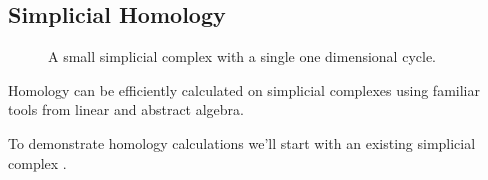 
\subsection{Simplicial Homology}\label{subsec:simpl-hom}

\begin{figure}
    
    \caption{A small simplicial complex with a single one dimensional cycle.}
    \label{fig:4pt-comp-1}
\end{figure}

Homology can be efficiently calculated on simplicial complexes using familiar tools from linear and abstract algebra.

To demonstrate homology calculations we'll start with an existing simplicial complex .

\begin{figure}
    \scalebox{.8}{
        
    }
    \caption{}
    \label{fig:hom-sets}
\end{figure}





%     


%     

